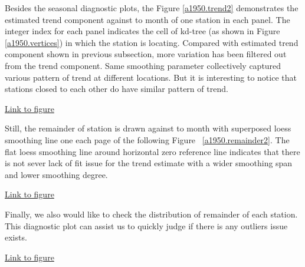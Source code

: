 Besides the seasonal diagnostic plots, the Figure 
\href{../plots/a1950/stlplus/t241td1_s41sd1_ffd/a1950.trend.vs.time.pdf}
{\ref*{a1950.trend2}} demonstrates the estimated trend component against to month
of one station in each panel. The integer index for each panel indicates the cell
of kd-tree (as shown in Figure \href{../plots/vertices.a1950.pdf}
{\ref*{a1950.vertices}}) in which the station is locating. Compared with estimated
trend component shown in previous subsection, more variation has been filtered 
out from the trend component. Same smoothing parameter collectively captured 
various pattern of trend at different locations. But it is interesting to notice
that stations closed to each other do have similar pattern of trend.


\begin{framed}
\begin{center}
  \href{../plots/a1950/stlplus/t241td1_s41sd1_ffd/a1950.trend.vs.time.pdf}
  {Link to figure}
  \label{a1950.trend2}
\end{center}
\end{framed}

Still, the remainder of station is drawn against to month with superposed loess
smoothing line one each page of the following Figure~
\href{../plots/a1950/stlplus/t241td1_s41sd1_ffd/a1950.remainder.vs.time.pdf}
{\ref*{a1950.remainder2}}. The flat loess smoothing line around horizontal zero
reference line indicates that there is not sever lack of fit issue for the trend
estimate with a wider smoothing span and lower smoothing degree.

\begin{framed}
\begin{center}
  \href{../plots/a1950/stlplus/t241td1_s41sd1_ffd/a1950.remainder.vs.time.pdf}
  {Link to figure}
  \label{a1950.remainder2}
\end{center}
\end{framed}

Finally, we also would like to check the distribution of remainder of each 
station. This diagnostic plot can assist us to quickly judge if there is any 
outliers issue exists.

\begin{framed}
\begin{center}
  \href{../plots/a1950/stlplus/t241td1_s41sd1_ffd/a1950.QQ.remainder.pdf}
  {Link to figure}
  \label{a1950.QQremainder2}
\end{center}
\end{framed}


